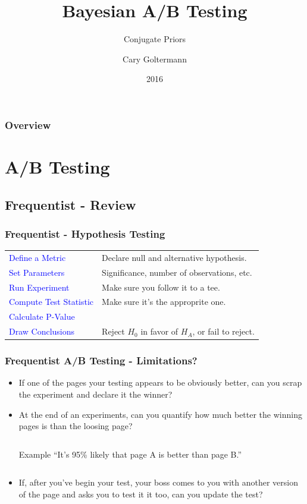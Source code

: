 \documentclass{beamer}
\title{Bayesian A/B Testing}
\subtitle{Conjugate Priors}
\author{Cary Goltermann}
\institute{Galvanize}
\date{2016}
\begin{document}
\frame{\titlepage}

\begin{frame}
  \frametitle{Overview}
  \tableofcontents[]
\end{frame}

\section{A/B Testing}
\subsection{Frequentist - Review}
\begin{frame}
  \frametitle{Frequentist - Hypothesis Testing}
  \begin{tabulary}{\textwidth}{LL}
    \textcolor{blue}{Define a Metric} & Declare null and alternative hypothesis. \\ [2mm]
    \textcolor{blue}{Set Parameters} & Significance, number of observations, etc. \\ [2mm]
    \textcolor{blue}{Run Experiment} & Make sure you follow it to a tee. \\ [2mm]
    \textcolor{blue}{Compute Test Statistic} & Make sure it's the approprite one. \\ [7mm]
    \textcolor{blue}{Calculate P-Value} & \\ [2mm]
    \textcolor{blue}{Draw Conclusions} & Reject $H_0$ in favor of $H_A$, or fail to reject. \\ [2mm]
  \end{tabulary}
\end{frame}

\begin{frame}
  \frametitle{Frequentist A/B Testing - Limitations?}
  \begin{itemize}
    \item If one of the pages your testing appears to be obviously better, can you scrap the experiment and declare it the winner?
    \item At the end of an experiments, can you quantify how much better the winning pages is than the loosing page?
      \begin{columns}
        \begin{block}{Example}
          ``It's 95\% likely that page A is better than page B.''
        \end{block}
        \vspace{2mm}
      \end{columns}
    \item If, after you've begin your test, your boss comes to you with another version of the page and asks you to test it it too, can you update the test?
  \end{itemize}
\end{frame}
\end{document}
